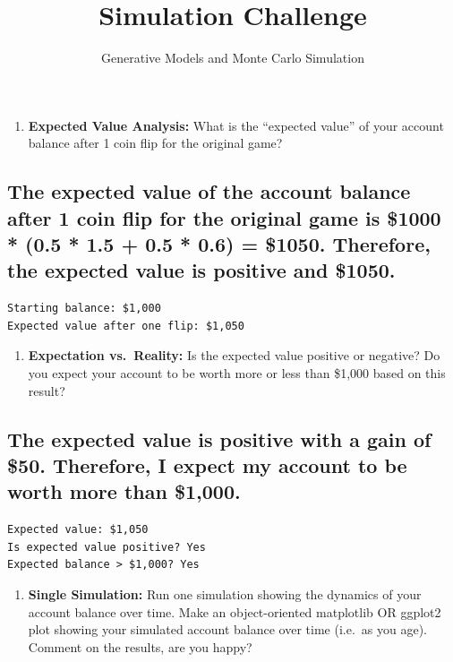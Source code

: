 \documentclass[
  letterpaper,
  DIV=11,
  numbers=noendperiod]{scrartcl}
\title{Simulation Challenge}
\subtitle{Generative Models and Monte Carlo Simulation}
\author{}
\date{}
\providecommand{\tightlist}{%
  \setlength{\itemsep}{0pt}\setlength{\parskip}{0pt}}
\begin{document}
\maketitle


\begin{enumerate}
\def\labelenumi{\arabic{enumi}.}
\tightlist
\item
  \textbf{Expected Value Analysis:} What is the ``expected value'' of
  your account balance after 1 coin flip for the original game?
\end{enumerate}

\subsection{The expected value of the account balance after 1 coin flip
for the original game is \$1000 * (0.5 * 1.5 + 0.5 * 0.6) = \$1050.
Therefore, the expected value is positive and
\$1050.}\label{the-expected-value-of-the-account-balance-after-1-coin-flip-for-the-original-game-is-1000-0.5-1.5-0.5-0.6-1050.-therefore-the-expected-value-is-positive-and-1050.}

\label{q1-expected-value}
\begin{verbatim}
Starting balance: $1,000
Expected value after one flip: $1,050
\end{verbatim}

\begin{enumerate}
\def\labelenumi{\arabic{enumi}.}
\setcounter{enumi}{1}
\tightlist
\item
  \textbf{Expectation vs.~Reality:} Is the expected value positive or
  negative? Do you expect your account to be worth more or less than
  \$1,000 based on this result?
\end{enumerate}

\subsection{The expected value is positive with a gain of \$50.
Therefore, I expect my account to be worth more than
\$1,000.}\label{the-expected-value-is-positive-with-a-gain-of-50.-therefore-i-expect-my-account-to-be-worth-more-than-1000.}

\label{q2-expectation-vs-reality}
\begin{verbatim}
Expected value: $1,050
Is expected value positive? Yes
Expected balance > $1,000? Yes
\end{verbatim}

\begin{enumerate}
\def\labelenumi{\arabic{enumi}.}
\setcounter{enumi}{2}
\tightlist
\item
  \textbf{Single Simulation:} Run one simulation showing the dynamics of
  your account balance over time. Make an object-oriented matplotlib OR
  ggplot2 plot showing your simulated account balance over time (i.e.~as
  you age). Comment on the results, are you happy?
\end{enumerate}
\end{document}
